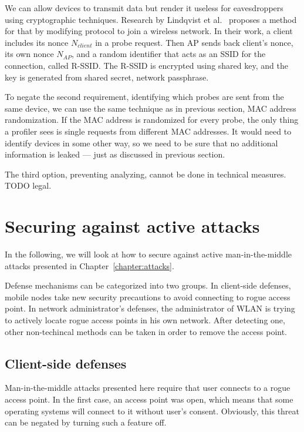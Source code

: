 \documentclass[12pt,a4paper,oneside,pdftex]{report}
\begin{document}
We can allow devices to transmit data but render it useless for eavesdroppers using cryptographic techniques. Research by Lindqvist et al.~\cite{lindqvist2009privacy} proposes a method for that by modifying protocol to join a wireless network. In their work, a client includes its nonce $N_{client}$ in a probe request. Then AP sends back client's nonce, its own nonce $N_{AP}$, and a random identifier that acts as an SSID for the connection, called R-SSID. The R-SSID is encrypted using shared key, and the key is generated from shared secret, network passphrase.

To negate the second requirement, identifying which probes are sent from the same device, we can use the same technique as in previous section, MAC address randomization. If the MAC address is randomized for every probe, the only thing a profiler sees is single requests from different MAC addresses. It would need to identify devices in some other way, so we need to be sure that no additional information is leaked --- just as discussed in previous section.

The third option, preventing analyzing, cannot be done in technical measures. TODO legal.


\section{Securing against active attacks}

In the following, we will look at how to secure against active man-in-the-middle attacks presented in Chapter~\ref{chapter:attacks}. 

Defense mechanisms can be categorized into two groups. In client-side defenses, mobile nodes take new security precautions to avoid connecting to rogue access point. In network administrator's defenses, the administrator of WLAN is trying to actively locate rogue access points in his own network. After detecting one, other non-techincal methods can be taken in order to remove the access point.

\subsection{Client-side defenses}

Man-in-the-middle attacks presented here require that user connects to a rogue access point. In the first case, an access point was open, which means that some operating systems will connect to it without user's consent. Obviously, this threat can be negated by turning such a feature off. 
\end{document}
